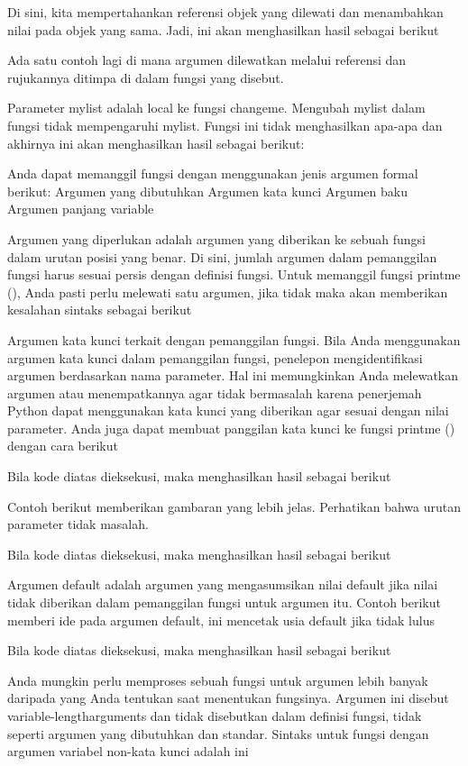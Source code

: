 Di sini, kita mempertahankan referensi objek yang dilewati dan menambahkan nilai pada objek yang sama. Jadi, ini akan menghasilkan hasil sebagai berikut 

Ada satu contoh lagi di mana argumen dilewatkan melalui referensi dan rujukannya ditimpa di dalam fungsi yang disebut. 

Parameter mylist adalah local ke fungsi changeme. Mengubah mylist dalam fungsi tidak mempengaruhi mylist. Fungsi ini tidak menghasilkan apa-apa dan akhirnya ini akan menghasilkan hasil sebagai berikut:

Anda dapat memanggil fungsi dengan menggunakan jenis argumen formal berikut: 
Argumen yang dibutuhkan 
Argumen kata kunci 
Argumen baku 
Argumen panjang variable 

Argumen yang diperlukan adalah argumen yang diberikan ke sebuah fungsi dalam urutan posisi yang benar. Di sini, jumlah argumen dalam pemanggilan fungsi harus sesuai persis dengan definisi fungsi. Untuk memanggil fungsi printme (), Anda pasti perlu melewati satu argumen, jika tidak maka akan memberikan kesalahan sintaks sebagai berikut 

Argumen kata kunci terkait dengan pemanggilan fungsi. Bila Anda menggunakan argumen kata kunci dalam pemanggilan fungsi, penelepon mengidentifikasi argumen berdasarkan nama parameter. Hal ini memungkinkan Anda melewatkan argumen atau menempatkannya agar tidak bermasalah karena penerjemah Python dapat menggunakan kata kunci yang diberikan agar sesuai dengan nilai parameter. Anda juga dapat membuat panggilan kata kunci ke fungsi printme () dengan cara berikut 

Bila kode diatas dieksekusi, maka menghasilkan hasil sebagai berikut 

Contoh berikut memberikan gambaran yang lebih jelas. Perhatikan bahwa urutan parameter tidak masalah. 

Bila kode diatas dieksekusi, maka menghasilkan hasil sebagai berikut 

Argumen default adalah argumen yang mengasumsikan nilai default jika nilai tidak diberikan dalam pemanggilan fungsi untuk argumen itu. Contoh berikut memberi ide pada argumen default, ini mencetak usia default jika tidak lulus

Bila kode diatas dieksekusi, maka menghasilkan hasil sebagai berikut 

Anda mungkin perlu memproses sebuah fungsi untuk argumen lebih banyak daripada yang Anda tentukan saat menentukan fungsinya. Argumen ini disebut variable-lengtharguments dan tidak disebutkan dalam definisi fungsi, tidak seperti argumen yang dibutuhkan dan standar. 
Sintaks untuk fungsi dengan argumen variabel non-kata kunci adalah ini 

